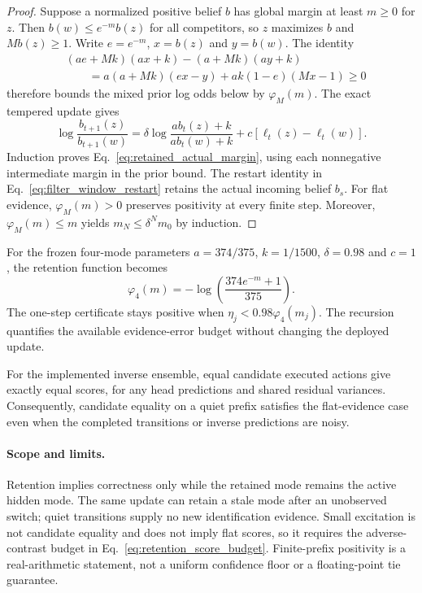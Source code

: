 \begin{proof}
Suppose a normalized positive belief $b$ has global margin at least $m\ge0$ for $z$.
Then $b(w)\le e^{-m}b(z)$ for all competitors, so $z$ maximizes $b$ and $Mb(z)\ge1$.
Write $e=e^{-m}$, $x=b(z)$ and $y=b(w)$.
The identity
\begin{align}
 &(ae+Mk)(ax+k)-(a+Mk)(ay+k)\nonumber\\
 &\qquad=a(a+Mk)(ex-y)+ak(1-e)(Mx-1)\ge0
 \label{eq:retention_prior_cross_product}
\end{align}
therefore bounds the mixed prior log odds below by $\varphi_M(m)$.
The exact tempered update gives
\begin{equation}
 \log\frac{b_{t+1}(z)}{b_{t+1}(w)}
 =\delta\log\frac{ab_t(z)+k}{ab_t(w)+k}
   +c[\ell_t(z)-\ell_t(w)].
\end{equation}
Induction proves Eq.~\eqref{eq:retained_actual_margin}, using each nonnegative intermediate margin in the prior bound.
The restart identity in Eq.~\eqref{eq:filter_window_restart} retains the actual incoming belief $b_s$.
For flat evidence, $\varphi_M(m)>0$ preserves positivity at every finite step.
Moreover, $\varphi_M(m)\le m$ yields $m_N\le\delta^N m_0$ by induction.
\end{proof}

For the frozen four-mode parameters $a=374/375$, $k=1/1500$, $\delta=0.98$ and $c=1$, the retention function becomes
\begin{equation}
 \varphi_4(m)=-\log\left(\frac{374e^{-m}+1}{375}\right).
 \label{eq:frozen_positive_retention}
\end{equation}
The one-step certificate stays positive when
$\eta_j<0.98\varphi_4(m_j)$.
The recursion quantifies the available evidence-error budget without changing the deployed update.

For the implemented inverse ensemble, equal candidate executed actions give exactly equal scores, for any head predictions and shared residual variances.
Consequently, candidate equality on a quiet prefix satisfies the flat-evidence case even when the completed transitions or inverse predictions are noisy.

\paragraph{Scope and limits.}
Retention implies correctness only while the retained mode remains the active hidden mode.
The same update can retain a stale mode after an unobserved switch; quiet transitions supply no new identification evidence.
Small excitation is not candidate equality and does not imply flat scores, so it requires the adverse-contrast budget in Eq.~\eqref{eq:retention_score_budget}.
Finite-prefix positivity is a real-arithmetic statement, not a uniform confidence floor or a floating-point tie guarantee.

